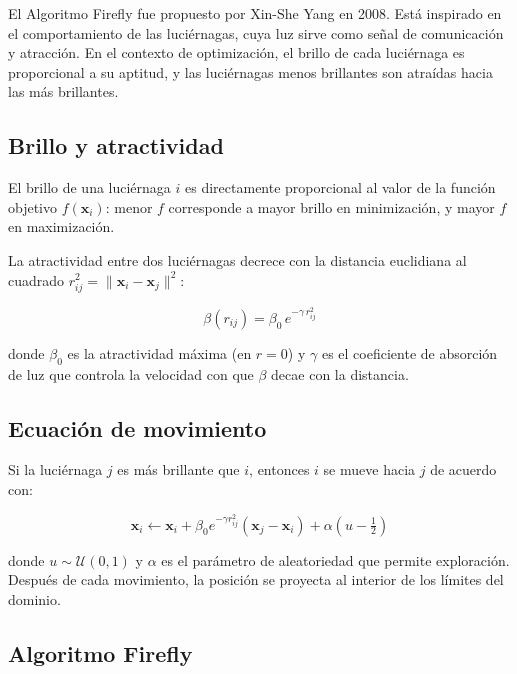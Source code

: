 \documentclass[11pt]{article}
\begin{document}
El Algoritmo Firefly fue propuesto por Xin-She Yang en 2008. Est\'a inspirado en el comportamiento de las luci\'ernagas, cuya luz sirve como se\~nal de comunicaci\'on y atracci\'on. En el contexto de optimizaci\'on, el brillo de cada luci\'ernaga es proporcional a su aptitud, y las luci\'ernagas menos brillantes son atra\'idas hacia las m\'as brillantes.

\subsection{Brillo y atractividad}

El brillo de una luci\'ernaga $i$ es directamente proporcional al valor de la funci\'on objetivo $f(\mathbf{x}_i)$: menor $f$ corresponde a mayor brillo en minimizaci\'on, y mayor $f$ en maximizaci\'on.

La atractividad entre dos luci\'ernagas decrece con la distancia euclidiana al cuadrado $r_{ij}^2 = \|\mathbf{x}_i - \mathbf{x}_j\|^2$:

\[
\beta(r_{ij}) = \beta_0 \, e^{-\gamma \, r_{ij}^2}
\]

donde $\beta_0$ es la atractividad m\'axima (en $r=0$) y $\gamma$ es el coeficiente de absorci\'on de luz que controla la velocidad con que $\beta$ decae con la distancia.

\subsection{Ecuaci\'on de movimiento}

Si la luci\'ernaga $j$ es m\'as brillante que $i$, entonces $i$ se mueve hacia $j$ de acuerdo con:

\[
\mathbf{x}_i \leftarrow \mathbf{x}_i + \beta_0 e^{-\gamma r_{ij}^2}(\mathbf{x}_j - \mathbf{x}_i) + \alpha \left(u - \tfrac{1}{2}\right)
\]

donde $u \sim \mathcal{U}(0,1)$ y $\alpha$ es el par\'ametro de aleatoriedad que permite exploraci\'on. Despu\'es de cada movimiento, la posici\'on se proyecta al interior de los l\'imites del dominio.

\subsection{Algoritmo Firefly}
\end{document}
